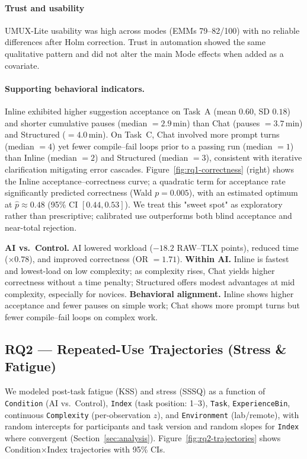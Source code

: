 \documentclass[sigconf]{acmart}
\begin{document}
\paragraph{Trust and usability}
UMUX-Lite usability was high across modes (EMMs 79--82/100) with no reliable differences after Holm correction. Trust in automation showed the same qualitative pattern and did not alter the main Mode effects when added as a covariate.

\paragraph{Supporting behavioral indicators.}
Inline exhibited higher suggestion acceptance on Task~A (mean $0.60$, SD $0.18$) and shorter cumulative pauses (median $=2.9$\,min) than Chat (pauses $=3.7$\,min) and Structured ($=4.0$\,min). On Task~C, Chat involved more prompt turns (median $=4$) yet fewer compile--fail loops prior to a passing run (median $=1$) than Inline (median $=2$) and Structured (median $=3$), consistent with iterative clarification mitigating error cascades. Figure~\ref{fig:rq1-correctness} (right) shows the Inline acceptance--correctness curve; a quadratic term for acceptance rate significantly predicted correctness (Wald $p{=}0.005$), with an estimated optimum at $\hat{p}{\approx}0.48$ (95\% CI $[0.44, 0.53]$). We treat this "sweet spot" as exploratory rather than prescriptive; calibrated use outperforms both blind acceptance and near-total rejection.

\textbf{AI vs.\ Control.} AI lowered workload (\(-18.2\) RAW--TLX points), reduced time (\(\times 0.78\)), and improved correctness (OR \(=1.71\)). \textbf{Within AI.} Inline is fastest and lowest-load on low complexity; as complexity rises, Chat yields higher correctness without a time penalty; Structured offers modest advantages at mid complexity, especially for novices. 
\textbf{Behavioral alignment.} Inline shows higher acceptance and fewer pauses on simple work; Chat shows more prompt turns but fewer compile–fail loops on complex work.


\subsection{RQ2 — Repeated-Use Trajectories (Stress \& Fatigue)}
\label{sec:rq2}
We modeled post-task fatigue (KSS) and stress (SSSQ) as a function of \texttt{Condition} (AI vs.\ Control), \texttt{Index} (task position: 1--3), \texttt{Task}, \texttt{ExperienceBin}, continuous \texttt{Complexity} (per-observation $z$), and \texttt{Environment} (lab/remote), with random intercepts for participants and task version and random slopes for \texttt{Index} where convergent (Section~\ref{sec:analysis}). Figure~\ref{fig:rq2-trajectories} shows Condition$\times$Index trajectories with 95\% CIs.
\end{document}
